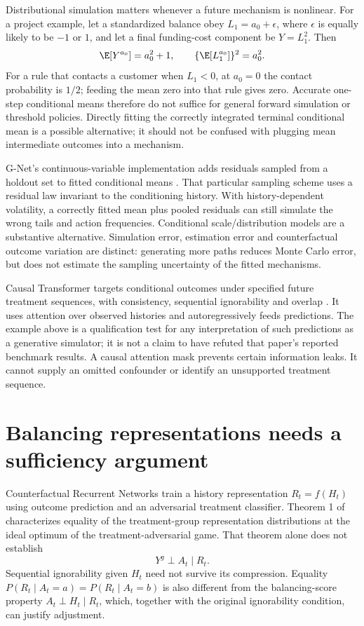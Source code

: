 Distributional simulation matters whenever a future mechanism is nonlinear.
For a project example, let a standardized balance obey
$L_1=a_0+\epsilon$, where $\epsilon$ is equally likely to be $-1$ or $1$,
and let a final funding-cost component be $Y=L_1^2$. Then
\[
 \E[Y^{a_0}]=a_0^2+1,\qquad
 \{\E[L_1^{a_0}]\}^2=a_0^2.
\]
For a rule that contacts a customer when $L_1<0$, at $a_0=0$ the contact
probability is $1/2$; feeding the mean zero into that rule gives zero.
Accurate one-step conditional means therefore do not suffice for general
forward simulation or threshold policies. Directly fitting the correctly
integrated terminal conditional mean is a possible alternative; it should
not be confused with plugging mean intermediate outcomes into a mechanism.

G-Net's continuous-variable implementation adds residuals sampled from a
holdout set to fitted conditional means \citep[Section 4, equation (5)]{gnet2020}.
That particular sampling scheme uses a residual law invariant to the
conditioning history. With history-dependent volatility, a correctly fitted
mean plus pooled residuals can still simulate the wrong tails and action
frequencies. Conditional scale/distribution models are a substantive
alternative. Simulation error, estimation error and counterfactual outcome
variation are distinct: generating more paths reduces Monte Carlo error,
but does not estimate the sampling uncertainty of the fitted mechanisms.

Causal Transformer targets conditional outcomes under specified future
treatment sequences, with consistency, sequential ignorability and overlap
\citep[Section 3 and Appendix A]{melnychuk2022}. It uses attention over
observed histories and autoregressively feeds predictions. The example
above is a qualification test for any interpretation of such predictions
as a generative simulator; it is not a claim to have refuted that paper's
reported benchmark results. A causal attention mask prevents certain
information leaks. It cannot supply an omitted confounder or identify an
unsupported treatment sequence.

\section{Balancing representations needs a sufficiency argument}
\label{r3:balance-limit}

Counterfactual Recurrent Networks train a history representation
$R_t=f(H_t)$ using outcome prediction and an adversarial treatment
classifier. Theorem 1 of \citet{bica2020} characterizes equality of the
treatment-group representation distributions at the ideal optimum of
the treatment-adversarial game. That theorem alone does not establish
\[
 Y^g\perp A_t\mid R_t.
\]
Sequential ignorability given $H_t$ need not survive its compression.
Equality $P(R_t\mid A_t=a)=P(R_t\mid A_t=b)$ is also different from the
balancing-score property $A_t\perp H_t\mid R_t$, which, together with the
original ignorability condition, can justify adjustment.

